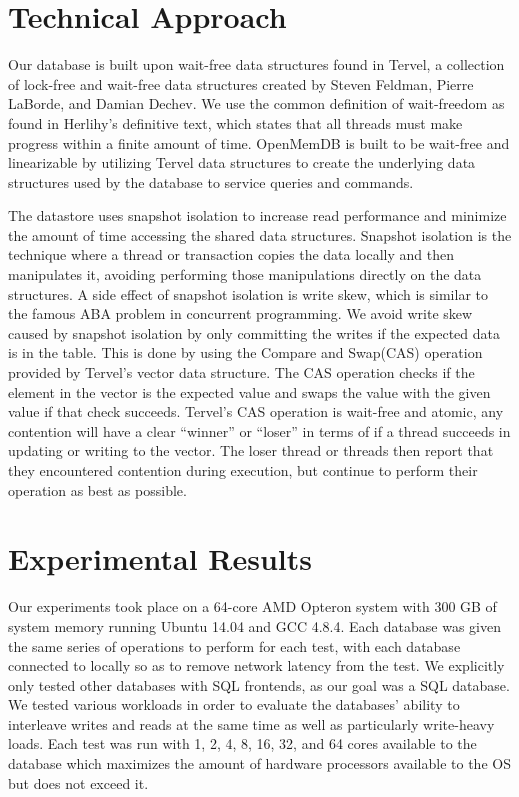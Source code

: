 \documentclass[conference, compsoc]{IEEEtran}
\begin{document}
\section{Technical Approach}
Our database is built upon wait-free data structures found in Tervel, a collection of
lock-free and wait-free data structures created by Steven Feldman, Pierre LaBorde, and Damian Dechev\cite{tervel:hazard_pointer}\cite{tervel:hash_map}\cite{tervel:vector}. 
We use the common definition of wait-freedom as found in Herlihy's definitive text, which
states that all threads must make progress within a finite amount of time\cite{herlihy:waitfree}. OpenMemDB is 
built to be wait-free and linearizable by utilizing Tervel data structures to create the 
underlying data structures used by the database to service queries and commands.

The datastore uses snapshot isolation to increase read performance and minimize the amount of time accessing
the shared data structures. Snapshot isolation is the technique where a thread or transaction copies the data
locally and then manipulates it, avoiding performing those manipulations directly on the data structures.
A side effect of snapshot isolation is write skew, which is similar to the famous ABA problem in concurrent
programming. We avoid write skew caused by snapshot isolation by only committing the writes
if the expected data is in the table. This is done by using the Compare and Swap(CAS) operation provided
by Tervel's vector data structure. The CAS operation checks if the element in the vector is the
expected value and swaps the value with the given value if that check succeeds. Tervel's CAS
operation is wait-free and atomic, any contention will have a clear ``winner'' or ``loser'' in terms
of if a thread succeeds in updating or writing to the vector. The loser thread or threads then report
that they encountered contention during execution, but continue to perform their operation as best as 
possible.

\section{Experimental Results}
Our experiments took place on a 64-core AMD Opteron system with 300 GB of system memory running Ubuntu 14.04 and 
GCC 4.8.4. Each database was given the same series of operations to perform for each test, with each database 
connected to locally so as to remove network latency from the test. We explicitly only tested other databases
with SQL frontends, as our goal was a SQL database. We tested various workloads in order to evaluate 
the databases' ability to interleave writes and reads at the same time as well as particularly write-heavy 
loads. Each test was run with 1, 2, 4, 8, 16, 32, and 64 cores available to the database which maximizes the amount of hardware processors
available to the OS but does not exceed it. 
\end{document}
